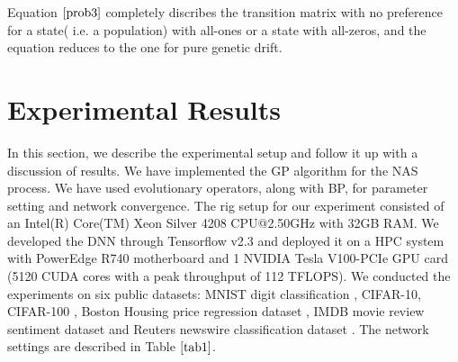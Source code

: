 \documentclass[conference]{IEEEtran}
\begin{document}
Equation $\ref{prob3}$ completely discribes the transition matrix with no preference for a state( i.e. a population) with all-ones or a state with all-zeros, and the equation reduces to the one for pure genetic drift.

\section{Experimental Results}

In this section, we describe the experimental setup and follow it up with a discussion of results. We have implemented the GP algorithm for the NAS process. We have used evolutionary operators, along with BP, for parameter setting and network convergence. The rig setup for our experiment consisted of an Intel(R) Core(TM) Xeon Silver 4208 CPU@2.50GHz with 32GB RAM. We developed the DNN through Tensorflow v2.3 and deployed it on a HPC system with PowerEdge R740 motherboard and 1 NVIDIA Tesla V100-PCIe GPU card (5120 CUDA cores with a peak throughput of 112 TFLOPS). We conducted the experiments on six public datasets: MNIST digit classification \cite{mnist}, CIFAR-10, CIFAR-100 \cite{cifar}, Boston Housing price regression dataset \cite{boston}, IMDB movie review sentiment dataset \cite{IMDB} and Reuters newswire classification dataset \cite{reuters}. The network settings are described in Table $\ref{tab1}$.
\end{document}
